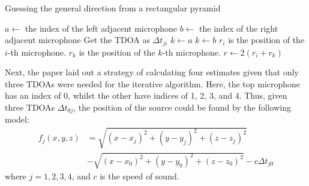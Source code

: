 \documentclass{report}
\begin{document}
\begin{algorithm}[H]
\caption{Guessing the general direction from a rectangular pyramid}
\label{alg:pyramid_guess}
\begin{algorithmic}
		\State $a \gets$ the index of the left adjacent microphone
		\State $b \gets$ the index of the right adjacent microphone
			\State Get the TDOA as $\Delta t_{ji}$
		\EndFor
				\State $k \gets a$
			\Else
				\State $k \gets b$
			\EndIf
			\State $r_i$ is the position of the $i$-th microphone.
			\State $r_k$ is the position of the $k$-th microphone.
			\State $r \gets 2 (r_{i} + r_{k})$ 
		\EndIf
	\EndFor
\end{algorithmic}
\end{algorithm}

Next, the paper laid out a strategy of calculating four estimates given that only three TDOAs were needed for the iterative algorithm. Here, the top microphone has an index of 0, whilst the other have indices of 1, 2, 3, and 4. Thus, given three TDOAs $\Delta t_{0j}$, the position of the source could be found by the following model:
\begin{equation}
\begin{split}
f_j(x,y,z) &= \sqrt{\left(x-x_j\right)^2 + (y - y_j)^2 + (z - z_j)^2} \\
&- \sqrt{\left(x-x_0\right)^2 + (y - y_0)^2 + (z - z_0)^2}
- c \Delta t_{j0}
\end{split}
\end{equation}
where $j = 1, 2, 3, 4$, and $c$ is the speed of sound.
\end{document}
